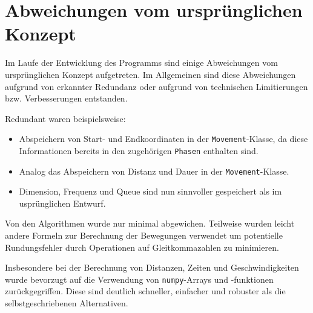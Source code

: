 \section{Abweichungen vom ursprünglichen Konzept}
\label{sec:abweichungen}

Im Laufe der Entwicklung des Programms sind einige Abweichungen vom ursprünglichen Konzept aufgetreten.
Im Allgemeinen sind diese Abweichungen aufgrund von erkannter Redundanz oder aufgrund von technischen Limitierungen bzw. Verbesserungen entstanden.

Redundant waren beispielsweise:
\begin{itemize}
    \item Abspeichern von Start- und Endkoordinaten in der \texttt{Movement}-Klasse, da diese Informationen bereits in den zugehörigen \texttt{Phasen} enthalten sind.
    \item Analog das Abspeichern von Distanz und Dauer in der \texttt{Movement}-Klasse.
    \item Dimension, Frequenz und Queue sind nun sinnvoller gespeichert als im usprünglichen Entwurf.
\end{itemize}

Von den Algorithmen wurde nur minimal abgewichen.
Teilweise wurden leicht andere Formeln zur Berechnung der Bewegungen verwendet um potentielle Rundungsfehler durch Operationen auf Gleitkommazahlen zu minimieren.

Insbesondere bei der Berechnung von Distanzen, Zeiten und Geschwindigkeiten wurde bevorzugt auf die Verwendung von \texttt{numpy}-Arrays und -funktionen zurückgegriffen.
Diese sind deutlich schneller, einfacher und robuster als die selbstgeschriebenen Alternativen.